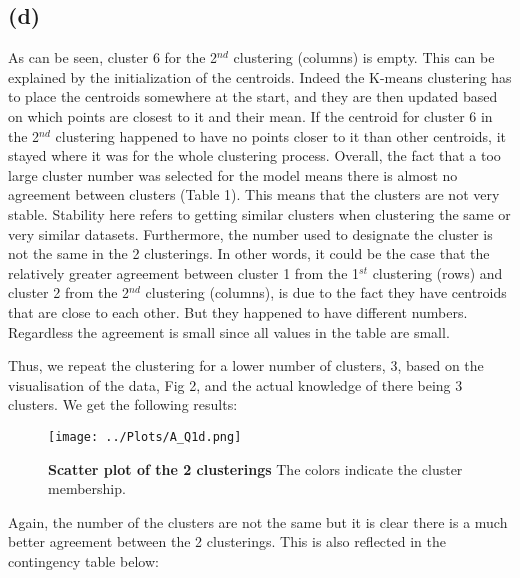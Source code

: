 \documentclass[12pt]{report} %
\begin{document}
\subsection*{(d)}

As can be seen, cluster 6 for the 2$^{nd}$ clustering (columns) is empty. This can be explained by the initialization of the centroids. Indeed the K-means clustering has to place the centroids somewhere at the start, and they are then updated based on which points are closest to it and their mean. If the centroid for cluster 6 in the 2$^{nd}$ clustering happened to have no points closer to it than other centroids, it stayed where it was for the whole clustering process\cite{scikit-learn}. Overall, the fact that a too large cluster number was selected for the model means there is almost no agreement between clusters (Table 1).  This means that the clusters are not very stable. Stability here refers to getting similar clusters when clustering the same or very similar datasets. Furthermore, the number used to designate the cluster is not the same in the 2 clusterings. In other words, it could be the case that the relatively greater agreement between cluster 1 from the 1$^{st}$ clustering (rows) and cluster 2 from the 2$^{nd}$ clustering (columns), is due to the fact they have centroids that are close to each other. But they happened to have different numbers. Regardless the agreement is small since all values in the table are small.  

Thus, we repeat the clustering for a lower number of clusters, 3, based on the visualisation of the data, Fig 2, and the actual knowledge of there being 3 clusters. We get the following results:


\begin{figure}[h]
    \centering
    \texttt{[image: ../Plots/A\_Q1d.png]}
    \caption{\textbf{Scatter plot of the 2 clusterings} The colors indicate the cluster membership.}
\end{figure}

Again, the number of the clusters are not the same but it is clear there is a much better agreement between the 2 clusterings. This is also reflected in the contingency table below:







\end{document}
